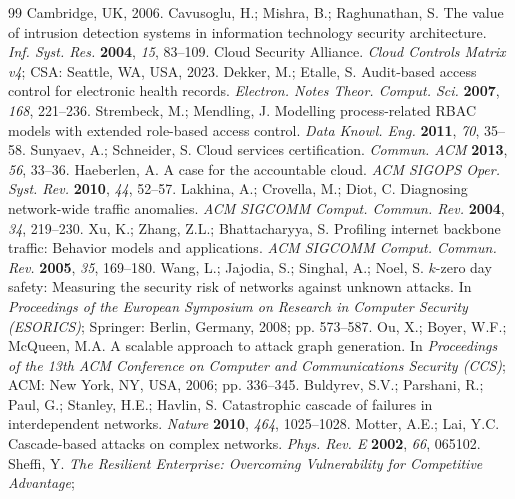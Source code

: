 \documentclass[conference]{IEEEtran}
\begin{document}
\begin{thebibliography}{99}
    Cambridge, UK, 2006.
    Cavusoglu, H.; Mishra, B.; Raghunathan, S.
    The value of intrusion detection systems in information technology security architecture.
    \textit{Inf. Syst. Res.} \textbf{2004}, \textit{15}, 83--109.
    Cloud Security Alliance.
    \textit{Cloud Controls Matrix v4}; CSA: Seattle, WA, USA, 2023.
    Dekker, M.; Etalle, S.
    Audit-based access control for electronic health records.
    \textit{Electron. Notes Theor. Comput. Sci.} \textbf{2007}, \textit{168}, 221--236.
    Strembeck, M.; Mendling, J.
    Modelling process-related RBAC models with extended role-based access control.
    \textit{Data Knowl. Eng.} \textbf{2011}, \textit{70}, 35--58.
    Sunyaev, A.; Schneider, S.
    Cloud services certification.
    \textit{Commun. ACM} \textbf{2013}, \textit{56}, 33--36.
    Haeberlen, A.
    A case for the accountable cloud.
    \textit{ACM SIGOPS Oper. Syst. Rev.} \textbf{2010}, \textit{44}, 52--57.
    Lakhina, A.; Crovella, M.; Diot, C.
    Diagnosing network-wide traffic anomalies.
    \textit{ACM SIGCOMM Comput. Commun. Rev.} \textbf{2004}, \textit{34}, 219--230.
    Xu, K.; Zhang, Z.L.; Bhattacharyya, S.
    Profiling internet backbone traffic: Behavior models and applications.
    \textit{ACM SIGCOMM Comput. Commun. Rev.} \textbf{2005}, \textit{35}, 169--180.
    Wang, L.; Jajodia, S.; Singhal, A.; Noel, S.
    $k$-zero day safety: Measuring the security risk of networks against unknown attacks.
    In \textit{Proceedings of the European Symposium on Research in Computer Security (ESORICS)};
    Springer: Berlin, Germany, 2008; pp. 573--587.
    Ou, X.; Boyer, W.F.; McQueen, M.A.
    A scalable approach to attack graph generation.
    In \textit{Proceedings of the 13th ACM Conference on Computer and Communications Security (CCS)};
    ACM: New York, NY, USA, 2006; pp. 336--345.
    Buldyrev, S.V.; Parshani, R.; Paul, G.; Stanley, H.E.; Havlin, S.
    Catastrophic cascade of failures in interdependent networks.
    \textit{Nature} \textbf{2010}, \textit{464}, 1025--1028.
    Motter, A.E.; Lai, Y.C.
    Cascade-based attacks on complex networks.
    \textit{Phys. Rev. E} \textbf{2002}, \textit{66}, 065102.
    Sheffi, Y.
    \textit{The Resilient Enterprise: Overcoming Vulnerability for Competitive Advantage};

\end{thebibliography}
\end{document}
